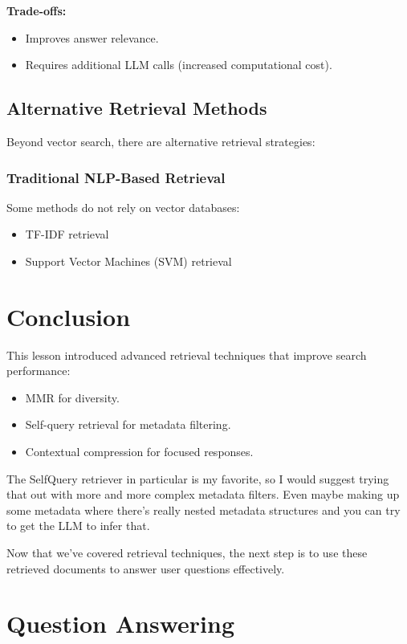 \documentclass{article}
\begin{document}
\textbf{Trade-offs:}

\begin{itemize}
    \item Improves answer relevance.
    \item Requires additional LLM calls (increased computational cost).
\end{itemize}

\subsection{Alternative Retrieval Methods}

Beyond vector search, there are alternative retrieval strategies:

\subsubsection{Traditional NLP-Based Retrieval}

Some methods do not rely on vector databases:
\begin{itemize}
    \item TF-IDF retrieval
    \item Support Vector Machines (SVM) retrieval
\end{itemize}

\section{Conclusion}
This lesson introduced advanced retrieval techniques that improve search performance:
\begin{itemize}
    \item MMR for diversity.
    \item Self-query retrieval for metadata filtering.
    \item Contextual compression for focused responses.
\end{itemize}

The SelfQuery retriever in particular is my favorite, so I would suggest trying that out with more and more complex metadata filters. Even maybe making up some metadata where there's really nested metadata structures and you can try to get the LLM to infer that.

Now that we've covered retrieval techniques, the next step is to use these retrieved documents to answer user questions effectively.

\section{Question Answering}
\end{document}
